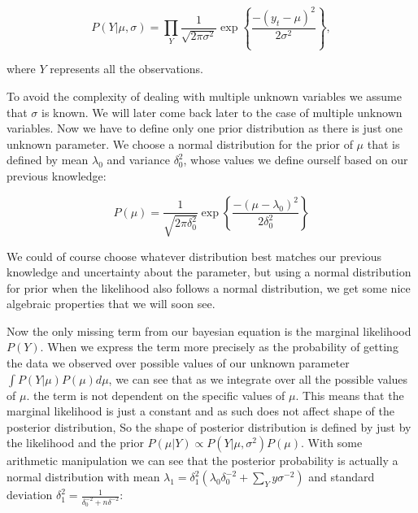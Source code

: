 \documentclass[12pt,a4paper,leqno]{report}
\theoremstyle{plain}
\theoremstyle{definition}
\theoremstyle{remark}
\begin{document}
\begin{def}\label{}
    \begin{equation}\label{}
        P(Y|\mu, \sigma)
        =
        \prod_{Y}
        \frac{1}
        {{\sqrt {2\pi \sigma^2} }}
        \exp{
            \left \{
            \frac{-(y_t - \mu)^2}
            {2\sigma^2}
            \right \}
        },
    \end{equation}
\end{def}where \(Y\) represents all the observations.

To avoid the complexity of dealing with multiple unknown variables we assume
that \(\sigma \) is known. We will later come back later to the case of multiple unknown variables.
Now we have to define only one prior distribution as there is just one unknown parameter.
We choose a normal distribution for the prior of \(\mu\) that is defined by mean \(\lambda_0 \)
and variance \(\delta_0^2 \), whose values we define ourself based on
our previous knowledge:

\begin{def}\label{}
    \begin{equation}\label{}
        P(\mu)
        =
        \frac{1}
        {{\sqrt {2\pi \delta_0^2} }}
        \exp{
            \left \{
            \frac{
                -(\mu - \lambda_0)^2
            }
            {2\delta_0^2}
            \right \}
        }
    \end{equation}
\end{def}

We could of course choose whatever distribution best
matches our previous knowledge and uncertainty about the parameter,
but using a normal distribution for prior when the likelihood also follows a normal distribution,
we get some nice algebraic properties that we will soon see.

Now the only missing term from our bayesian equation is the marginal likelihood \(P(Y) \).
When we express the term more precisely as the probability of getting the data we observed
over possible values of our unknown parameter \(\int P(Y|\mu)P(\mu) d\mu \),
we can see that as we integrate over all the possible values of \(\mu \).
the term is not dependent on the specific values of \(\mu \).
This means that the marginal likelihood is just a constant and as such does not affect shape of the posterior distribution,
So the shape of posterior distribution is defined by just by the likelihood and the prior
\(P(\mu|Y) \propto P(Y|\mu, \sigma^2)P(\mu) \). With some arithmetic manipulation we can
see that the posterior probability is actually a normal distribution with mean
\(\lambda_1 = \delta_1^2 \left( \lambda_0 \delta_0^{-2} + \sum_{Y} y \sigma^{-2} \right) \)
and standard deviation \(\delta_1^2 = \frac{1}{\delta_0^{-2}+n\delta^{-2}} \):
\end{document}
